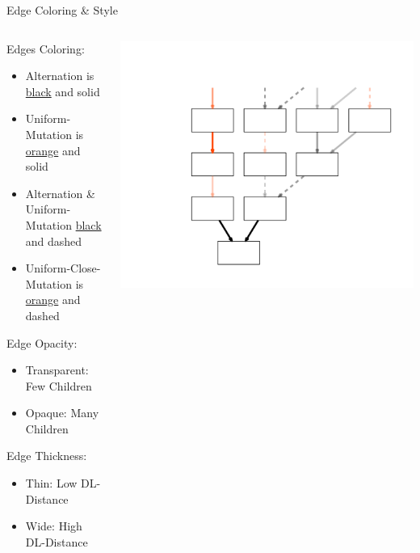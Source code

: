 \documentclass{beamer}
\begin{document}
\begin{frame}{Edge Coloring \& Style}
	\begin{columns}
		\begin{column}{.47\textwidth}
		\begin{overprint}
				\hspace{.5cm} Edges Coloring:
				\begin{itemize}
					\item Alternation is \underline{black} and solid
					\item Uniform-Mutation is \underline{\color{orange} orange} and solid
					\item Alternation \& Uniform-Mutation \underline{black} and dashed
					\item Uniform-Close-Mutation is \underline{\color{orange} orange} and dashed
				\end{itemize} 
				\hspace{.5cm} Edge Opacity:
				\begin{itemize}
					\item Transparent: Few Children
					\item Opaque: Many Children
				\end{itemize} 
				\hspace{.5cm} Edge Thickness:
				\begin{itemize}
					\item Thin: Low DL-Distance
					\item Wide: High DL-Distance
				\end{itemize}
		\end{overprint}
		\end{column}
		
		\begin{column}{.6\textwidth}
		\begin{overprint}
			\onslide<1-3>
			 	\centering
			 	\includegraphics[width=\textwidth]{Illustrations/family_edges.pdf} 
		\end{overprint}
		\end{column}
\end{columns}
\end{frame}
\end{document}
